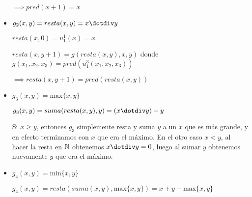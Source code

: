 \begin{itemize}
    $\implies pred(x + 1) = x$

    \item
    $g_2(x, y) = resta(x, y) = x \dotdiv y$

    $resta(x, 0) = u^1_1(x) = x$

    $resta(x, y + 1) = g(resta(x, y), x, y)$ donde $g(x_1, x_2, x_3) = pred(u^3_1(x_1, x_2, x_3))$

    $\implies resta(x, y + 1) = pred(resta(x, y))$

    \item
    $g_3(x, y) = \text{max}\{x, y\}$

    $g_3(x, y) = suma(resta(x, y), y) = (x \dotdiv y) + y$

    Si $x \geq y$, entonces $g_3$ simplemente resta y suma $y$ a un $x$ que es más grande, y en efecto terminamos con $x$ que era el máximo. En el otro caso $x < y$, al hacer la resta en $\mathbb{N}$ obtenemos $x \dotdiv y = 0$, luego al sumar $y$ obtenemos nuevamente $y$ que era el máximo.

    \item
    $g_4(x, y) = \text{min}\{x, y\}$

    $g_4(x, y) = resta(suma(x, y), \text{max}\{x, y\}) = x + y - \text{max}\{x, y\}$
\end{itemize}
